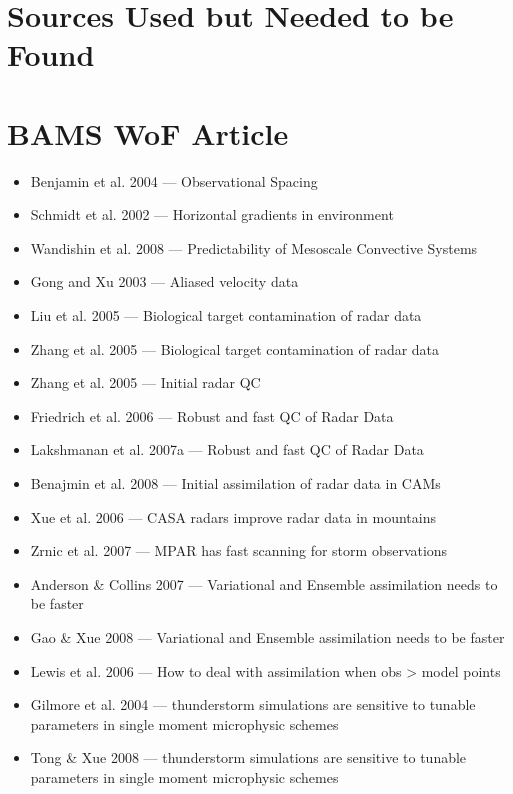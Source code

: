 \documentclass{article}
\begin{document}
\section{Sources Used but Needed to be Found}


\section{BAMS WoF Article}
    \begin{itemize}
        \item Benjamin et al. 2004 --- Observational Spacing
        \item Schmidt et al. 2002  --- Horizontal gradients in environment
        \item Wandishin et al. 2008 --- Predictability of Mesoscale Convective Systems
        \item Gong and Xu 2003 --- Aliased velocity data
        \item Liu et al. 2005 --- Biological target contamination of radar data
        \item Zhang et al. 2005 --- Biological target contamination of radar data
        \item Zhang et al. 2005 --- Initial radar QC
        \item Friedrich et al. 2006 --- Robust and fast QC of Radar Data
        \item Lakshmanan et al. 2007a --- Robust and fast QC of Radar Data
        \item Benajmin et al. 2008 --- Initial assimilation of radar data in CAMs
        \item Xue et al. 2006 --- CASA radars improve radar data in mountains
        \item Zrnic et al. 2007 --- MPAR has fast scanning for storm observations
        \item Anderson \& Collins 2007 --- Variational and Ensemble assimilation needs to be faster
        \item Gao \& Xue 2008 --- Variational and Ensemble assimilation needs to be faster
        \item Lewis et al. 2006 --- How to deal with assimilation when obs > model points
        \item Gilmore et al. 2004 --- thunderstorm simulations are sensitive to tunable parameters in single moment microphysic schemes
        \item Tong \& Xue 2008 --- thunderstorm simulations are sensitive to tunable parameters in single moment microphysic schemes

\end{itemize}
\end{document}
